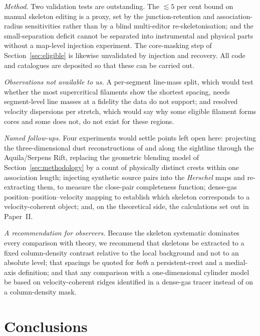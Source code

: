 \documentclass[usenatbib,twoside,twocolumn]{mnras}
\begin{document}
\emph{Method.} Two validation tests are outstanding. The $\lesssim5$ per cent bound on manual skeleton editing is a proxy, set by the junction-retention and association-radius sensitivities rather than by a blind multi-editor re-skeletonisation; and the small-separation deficit cannot be separated into instrumental and physical parts without a map-level injection experiment. The core-masking step of Section~\ref{sec:eligible} is likewise unvalidated by injection and recovery. All code and catalogues are deposited so that these can be carried out.

\emph{Observations not available to us.} A per-segment line-mass split, which would test whether the most supercritical filaments show the shortest spacing, needs segment-level line masses at a fidelity the data do not support; and resolved velocity dispersions per stretch, which would say why some eligible filament forms cores and some does not, do not exist for these regions.

\smallskip\noindent\emph{Named follow-ups.} Four experiments would settle points left open here: projecting the three-dimensional dust reconstructions of \citet{Zucker2020} and \citet{Green2024} along the sightline through the Aquila/Serpens Rift, replacing the geometric blending model of Section~\ref{sec:methodology} by a count of physically distinct crests within one association length; injecting synthetic source pairs into the \textit{Herschel} maps and re-extracting them, to measure the close-pair completeness function; dense-gas position--position--velocity mapping to establish which skeleton corresponds to a velocity-coherent object; and, on the theoretical side, the calculations set out in Paper~II.

\smallskip\noindent\emph{A recommendation for observers.} Because the skeleton systematic dominates every comparison with theory, we recommend that skeletons be extracted to a fixed column-density contrast relative to the local background and not to an absolute level; that spacings be quoted for \emph{both} a persistent-crest and a medial-axis definition; and that any comparison with a one-dimensional cylinder model be based on velocity-coherent ridges identified in a dense-gas tracer instead of on a column-density mask.




\section{Conclusions}
\label{sec:conclusions}
\end{document}

